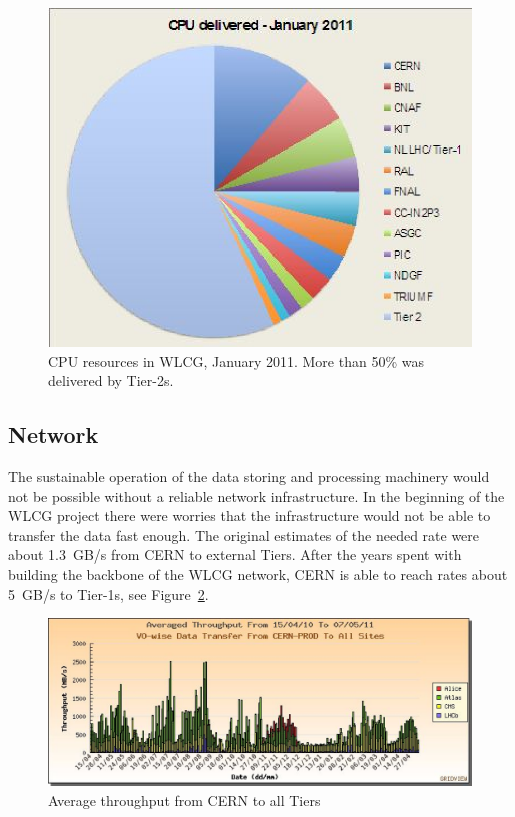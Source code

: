 \begin{figure}[htb] %
\centering
\includegraphics[width=13cm]{fig06.eps} %
\caption{CPU resources in WLCG, January 2011. More than 50\% was
delivered by Tier-2s.}\label{fig06}
\end{figure}



\subsection{Network}
%
The sustainable operation of the data storing and processing
machinery would not be possible without a reliable network
infrastructure. In the beginning of the WLCG project there were
worries that the infrastructure would not be able to transfer the
data fast enough. The original estimates of the needed rate were
about 1.3~GB/s from CERN to external Tiers. After the years spent
with building the backbone of the WLCG network, CERN
is able to reach rates about 5~GB/s to Tier-1s, see
Figure~\ref{fig07}.

\begin{figure}[htb] %
\centering
\includegraphics[width=13cm]{fig07.eps} %
\caption{Average throughput from CERN to all Tiers}\label{fig07}
\end{figure}


